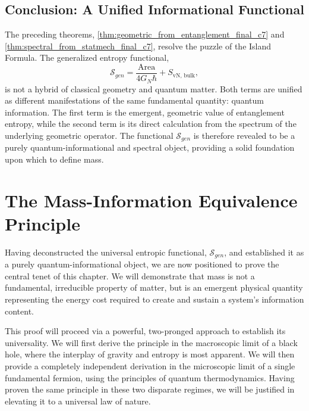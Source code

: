 \documentclass[11pt, letterpaper]{report}
\theoremstyle{plain} %
\theoremstyle{definition} %
\theoremstyle{remark} %
\begin{document}
\subsection{Conclusion: A Unified Informational Functional}
\label{subsec:unified_functional_conclusion}

The preceding theorems, \ref{thm:geometric_from_entanglement_final_c7} and \ref{thm:spectral_from_statmech_final_c7}, resolve the puzzle of the Island Formula. The generalized entropy functional,
\begin{equation}
    \mathcal{S}_{gen} = \frac{\text{Area}}{4G_N\hbar} + S_{\text{vN, bulk}},
\end{equation}
is not a hybrid of classical geometry and quantum matter. Both terms are unified as different manifestations of the same fundamental quantity: quantum information. The first term is the emergent, geometric value of entanglement entropy, while the second term is its direct calculation from the spectrum of the underlying geometric operator. The functional $\mathcal{S}_{gen}$ is therefore revealed to be a purely quantum-informational and spectral object, providing a solid foundation upon which to define mass.














\section{The Mass-Information Equivalence Principle}
\label{sec:mass_info_equivalence_principle}

Having deconstructed the universal entropic functional, $\mathcal{S}_{gen}$, and established it as a purely quantum-informational object, we are now positioned to prove the central tenet of this chapter. We will demonstrate that mass is not a fundamental, irreducible property of matter, but is an emergent physical quantity representing the energy cost required to create and sustain a system's information content.

This proof will proceed via a powerful, two-pronged approach to establish its universality. We will first derive the principle in the macroscopic limit of a black hole, where the interplay of gravity and entropy is most apparent. We will then provide a completely independent derivation in the microscopic limit of a single fundamental fermion, using the principles of quantum thermodynamics. Having proven the same principle in these two disparate regimes, we will be justified in elevating it to a universal law of nature.
\end{document}
